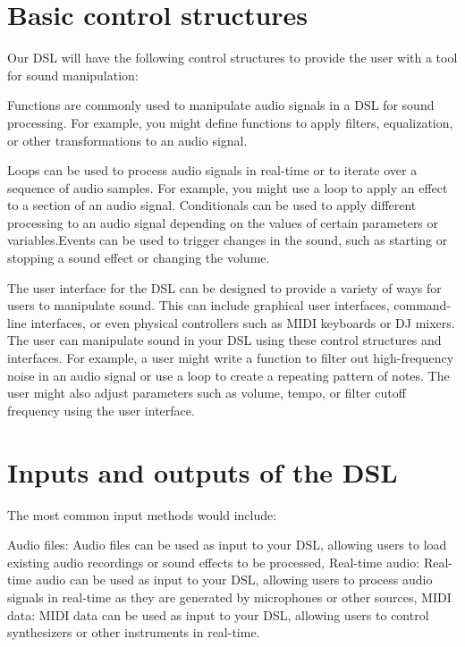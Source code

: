 \section{Basic control structures}
Our DSL will have the following control structures to provide the 
user with a tool for sound manipulation:

Functions are commonly used to manipulate audio signals in a DSL 
for sound processing. For example, you might define functions to 
apply filters, equalization, or other transformations to an audio 
signal.

Loops can be used to process audio signals in real-time or to 
iterate over a sequence of audio samples. For example, you might 
use a loop to apply an effect to a section of an audio signal.
Conditionals can be used to apply different processing to an audio 
signal depending on the values of certain parameters or 
variables.Events can be used to trigger changes in the sound, such 
as starting or stopping a sound effect or changing the volume.

The user interface for the DSL can be designed to provide a 
variety of ways for users to manipulate sound. This can include 
graphical user interfaces, command-line interfaces, or even 
physical controllers such as MIDI keyboards or DJ mixers.
The user can manipulate sound in your DSL using these control 
structures and interfaces. For example, a user might write a 
function to filter out high-frequency noise in an audio signal or 
use a loop to create a repeating pattern of notes. The user might 
also adjust parameters such as volume, tempo, or filter cutoff 
frequency using the user interface.

\section{Inputs and outputs of the DSL}
\par The most common input methods would include:
\begin{itemize}
    \hitem Audio files: Audio files can be used as input to your 
    DSL, allowing users to load existing audio recordings or sound 
    effects to be processed,
    \hitem Real-time audio: Real-time audio can be used as input to 
    your DSL, allowing users to process audio signals in real-time 
    as they are generated by microphones or other sources,
    \hitem MIDI data: MIDI data can be used as input to your DSL, 
    allowing users to control synthesizers or other instruments in 
    real-time.
\end{itemize}

